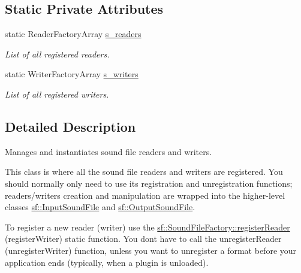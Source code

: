\subsection*{Static Private Attributes}
\begin{DoxyCompactItemize}
\item 
\mbox{\label{classsf_1_1_sound_file_factory_a823e083321d592370ce4b258d0da10aa}} 
static Reader\+Factory\+Array \mbox{\hyperlink{classsf_1_1_sound_file_factory_a823e083321d592370ce4b258d0da10aa}{s\+\_\+readers}}
\begin{DoxyCompactList}\small\item\em List of all registered readers. \end{DoxyCompactList}\item 
\mbox{\label{classsf_1_1_sound_file_factory_ad9e5d855ef07f5895bcb91eb3431f088}} 
static Writer\+Factory\+Array \mbox{\hyperlink{classsf_1_1_sound_file_factory_ad9e5d855ef07f5895bcb91eb3431f088}{s\+\_\+writers}}
\begin{DoxyCompactList}\small\item\em List of all registered writers. \end{DoxyCompactList}\end{DoxyCompactItemize}


\subsection{Detailed Description}
Manages and instantiates sound file readers and writers. 

\begin{DoxyVerb}\end{DoxyVerb}


This class is where all the sound file readers and writers are registered. You should normally only need to use its registration and unregistration functions; readers/writers creation and manipulation are wrapped into the higher-\/level classes \mbox{\hyperlink{classsf_1_1_input_sound_file}{sf\+::\+Input\+Sound\+File}} and \mbox{\hyperlink{classsf_1_1_output_sound_file}{sf\+::\+Output\+Sound\+File}}.

To register a new reader (writer) use the \mbox{\hyperlink{classsf_1_1_sound_file_factory_acaf1f0bf1b7c7b9988ec76b33e33fe95}{sf\+::\+Sound\+File\+Factory\+::register\+Reader}} (register\+Writer) static function. You don\textquotesingle{}t have to call the unregister\+Reader (unregister\+Writer) function, unless you want to unregister a format before your application ends (typically, when a plugin is unloaded).

